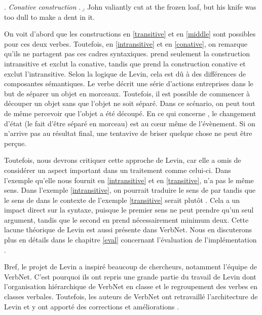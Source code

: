 \ex. \label{conative} \emph{Conative construction}
	\a.
	\b. John valiantly cut at the frozen loaf, but his knife was too dull to make a dent in it.

On voit d'abord que les constructions en \ref{transitive} et en \ref{middle} sont possibles pour ces deux verbes. Toutefois, en \ref{intransitive} et en \ref{conative}, on remarque qu'ils ne partagent pas ces cadres syntaxiques.  prend seulement la construction intransitive et exclut la conative, tandis que  prend la construction conative et exclut l'intransitive. Selon la logique de Levin, cela est dû à des différences de composantes sémantiques. Le verbe  décrit une série d'actions entreprises dans le but de séparer un objet en morceaux. Toutefois, il est possible de commencer à découper un objet sans que l'objet ne soit séparé. Dans ce scénario, on peut tout de même percevoir que l'objet a été découpé. En ce qui concerne , le changement d'état (le fait d'être séparé en morceau) est au c\oe{}ur même de l'évènement. Si on n'arrive pas au résultat final, une tentavive de briser quelque chose ne peut être perçue. 

Toutefois, nous devrons critiquer cette approche de Levin, car elle a omis de considérer un aspect important dans un traitement comme celui-ci. Dans l'exemple qu'elle nous fournit en \ref{intransitive} et en \ref{transitive},  n'a pas le même sens. Dans l'exemple \ref{intransitive}, on pourrait traduire le sens de  par  tandis que le sens de  dans le contexte de l'exemple \ref{transitive} serait plutôt . Cela a un impact direct sur la syntaxe, puisque le premier sens ne peut prendre qu'un seul argument, tandis que le second en prend nécessairement minimum deux. Cette lacune théorique de Levin est aussi présente dans VerbNet. Nous en discuterons plus en détails dans le chapitre \ref{eval} concernant l'évaluation de l'implémentation .

Bref, le projet de Levin a inspiré beaucoup de chercheurs, notamment l'équipe de VerbNet. C'est pourquoi ils ont repris une grande partie du travail de Levin dont l'organisation hiérarchique de VerbNet en classe et le regroupement des verbes en classes verbales. Toutefois, les auteurs de VerbNet ont retravaillé l'architecture de Levin et y ont apporté des corrections et améliorations \citep{verbnet.2006}.


